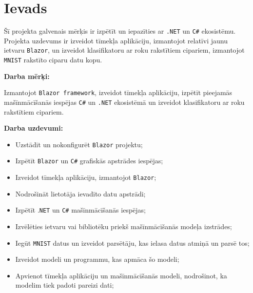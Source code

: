 \section{Ievads}

    Šī projekta galvenais mērķis ir izpētīt un iepazīties
    ar \texttt{.NET} un \texttt{C\#} ekosistēmu. Projekta uzdevums ir izveidot tīmekļa aplikāciju, izmantojot relatīvi
    jaunu ietvaru \texttt{Blazor}, un izveidot klasifikatoru ar roku rakstītiem cipariem, izmantojot
    \texttt{MNIST} rakstīto ciparu datu kopu.

    \textbf{Darba mērķi:}

    Izmantojot \texttt{Blazor framework}, izveidot tīmekļa aplikāciju, izpētīt pieejamās mašīnmācīšanās
    iespējas \texttt{C\#} un \texttt{.NET} ekosistēmā un izveidot klasifikatoru ar roku rakstītiem cipariem.

    \textbf{Darba uzdevumi:}

    \begin{itemize}
        \item Uzstādīt un nokonfigurēt \texttt{Blazor} projektu;
        \item Izpētīt \texttt{Blazor} un \texttt{C\#} grafiskās apstrādes iespējas;
        \item Izveidot tīmekļa aplikāciju, izmantojot \texttt{Blazor};
        \item Nodrošināt lietotāja ievadīto datu apstrādi;
        \item Izpētīt .\texttt{NET} un \texttt{C\#} mašīnmācīšanās iespējas;
        \item Izvēlēties ietvaru vai bibliotēku priekš mašīnmācīšanās modeļa izstrādes;
        \item Iegūt \texttt{MNIST} datus un izveidot parsētāju, kas ielasa datus atmiņā un parsē tos;
        \item Izveidot modeli un programmu, kas apmāca šo modeli;
        \item Apvienot tīmekļa aplikāciju un mašīnmācīšanās modeli, nodrošinot, ka modelim tiek padoti pareizi dati;
    \end{itemize}

